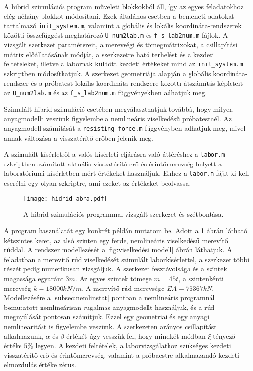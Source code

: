 {\ }

A hibrid szimulációs program műveleti blokkokból áll, így az egyes feladatokhoz elég néhány blokkot módosítani. Ezek általános esetben a bemeneti adatokat tartalmazó \verb|init_system.m|, valamint a globális és lokális koordináta-rendszerek közötti összefüggést meghatározó \verb|U_num2lab.m| és  \verb|f_s_lab2num.m| fájlok.  A vizsgált szerkezet paramétereit, a merevségi és tömegmátrixokat, a csillapítási mátrix előállatásának módját, a szerkezetre ható terhelést és a kezdeti feltételeket, illetve a labornak küldött kezdeti értékeket mind az \verb|init_system.m| szkriptben módosíthatjuk. A szerkezet geometriája alapján a globális koordináta-rendszer és a próbatest lokális koordináta-rendszere közötti átszámítás képleteit  az \verb|U_num2lab.m| és az \verb|f_s_lab2num.m| függvényekben adhatjuk meg. 

Szimulált hibrid szimuláció esetében megválaszthatjuk továbbá, hogy milyen anyagmodellt veszünk figyelembe a nemlineáris viselkedésű próbatestnél.  Az anyagmodell számítását a \verb|resisting_force.m| függvényben adhatjuk meg, mivel annak változása  a visszatérítő erőben jelenik meg.

A szimulált kísérletről a valós kísérleti eljárásra való áttéréshez a \verb|labor.m| szkriptben számított aktuális visszatérítő erő és érintőmerevség helyett  a laboratóriumi kísérletben mért értékeket használjuk. Ehhez a \verb|labor.m| fájlt ki kell cserélni egy olyan  szkriptre, ami ezeket az értékeket beolvassa.

\begin{figure}[h!]
\centering
\texttt{[image: hidrid\_abra.pdf]}
\caption{A hibrid szimulációs programmal vizsgált szerkezet  és szétbontása.}
\label{fig:hibridprogpélda}
\end{figure}


A program használatát egy konkrét példán mutatom be. Adott a \ref{fig:hibridprogpélda} ábrán látható kétszintes keret, az alsó szinten egy ferde, nemlineáris viselkedésű merevítő rúddal. A rendszer modellezését a \ref{fig:viselkedési modell} ábrán láthatjuk. A feladatban a merevítő rúd viselkedését  szimulált laborkísérlettel, a  szerkezet többi részét pedig numerikusan vizsgáljuk. A szerkezet fesztávolsága és a szintek magassága egyaránt $3 m$. Az egyes szintek tömege $m = 45 t$, a szintenkénti merevség $k = 18000 kN/m$. A merevítő rúd merevsége $EA = 76367 kN$.  Modellezésére a \ref{subsec:nemlinstat} pontban a nemlineáris programnál bemutatott nemlineárisan rugalmas anyagmodellt használjuk, és a rúd megnyúlását pontosan számítjuk. Ezzel egy geometriai és egy anyagi nemlinearitást is figyelembe veszünk. A  szerkezeten arányos csillapítást alkalmazunk, $\alpha$ és $\beta$ értékét úgy vesszük fel, hogy mindkét módban $\xi$ tényező értéke $5\%$ legyen.   A kezdeti feltételek,  a laborvizsgálathoz szükséges  kezdeti visszatérítő erő és érintőmerevség, valamint a próbaestre alkalmazandó kezdeti elmozdulás értéke zérus.


